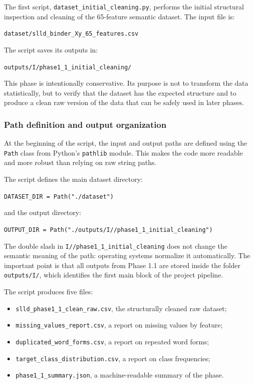 \documentclass{ipgpmaster}
\begin{document}
The first script, \texttt{dataset\_initial\_cleaning.py}, performs the initial structural inspection and cleaning of the 65-feature semantic dataset. The input file is:

\begin{center}
\texttt{dataset/slld\_binder\_Xy\_65\_features.csv}
\end{center}

The script saves its outputs in:

\begin{center}
\texttt{outputs/I/phase1\_1\_initial\_cleaning/}
\end{center}

This phase is intentionally conservative. Its purpose is not to transform the data statistically, but to verify that the dataset has the expected structure and to produce a clean raw version of the data that can be safely used in later phases.

\subsubsection{Path definition and output organization}

At the beginning of the script, the input and output paths are defined using the \texttt{Path} class from Python's \texttt{pathlib} module. This makes the code more readable and more robust than relying on raw string paths.

The script defines the main dataset directory:

\begin{center}
\texttt{DATASET\_DIR = Path("./dataset")}
\end{center}

and the output directory:

\begin{center}
\texttt{OUTPUT\_DIR = Path("./outputs/I//phase1\_1\_initial\_cleaning")}
\end{center}

The double slash in \texttt{I//phase1\_1\_initial\_cleaning} does not change the semantic meaning of the path: operating systems normalize it automatically. The important point is that all outputs from Phase 1.1 are stored inside the folder \texttt{outputs/I/}, which identifies the first main block of the project pipeline.

The script produces five files:

\begin{itemize}
    \item \texttt{slld\_phase1\_1\_clean\_raw.csv}, the structurally cleaned raw dataset;
    \item \texttt{missing\_values\_report.csv}, a report on missing values by feature;
    \item \texttt{duplicated\_word\_forms.csv}, a report on repeated word forms;
    \item \texttt{target\_class\_distribution.csv}, a report on class frequencies;
    \item \texttt{phase1\_1\_summary.json}, a machine-readable summary of the phase.
\end{itemize}
\end{document}
